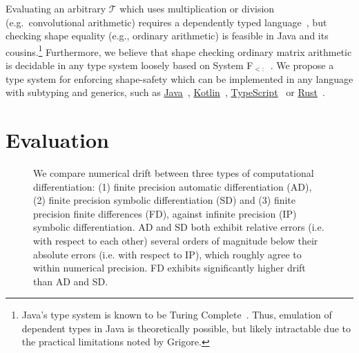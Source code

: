 \documentclass{article}
\begin{document}
Evaluating an arbitrary $\mathcal{T}$ which uses multiplication or division (e.g.\ convolutional arithmetic) requires a dependently typed language~\citep{xi1998eliminating, pineyro2019structure}, but checking shape equality (e.g., ordinary arithmetic) is feasible in Java and its cousins.\footnote{Java's type system is known to be Turing Complete~\citep{grigore2017java}. Thus, emulation of dependent types in Java is theoretically possible, but likely intractable due to the practical limitations noted by Grigore.} Furthermore, we believe that shape checking ordinary matrix arithmetic is decidable in any type system loosely based on System F${}_{<:}$~\citep{cardelli1991extension}. We propose a type system for enforcing shape-safety which can be implemented in any language with subtyping and generics, such as \href{https://docs.oracle.com/javase/tutorial/java/generics/index.html}{Java}~\citep{naftalin2007java}, \href{https://kotlinlang.org/docs/reference/generics.html}{Kotlin}~\citep{tate2013mixed}, \href{https://www.typescriptlang.org/docs/handbook/advanced-types.html}{TypeScript}~\citep{bierman2014understanding} or \href{https://doc.rust-lang.org/1.7.0/book/generics.html}{Rust}~\citep{crozet2019nalgebra}.

\section{Evaluation}
\begin{figure}
    \caption{We compare numerical drift between three types of computational differentiation: (1) finite precision automatic differentiation (AD), (2) finite precision symbolic differentiation (SD) and (3) finite precision finite differences (FD), against infinite precision (IP) symbolic differentiation. AD and SD both exhibit relative errors (i.e. with respect to each other) several orders of magnitude below their absolute errors (i.e. with respect to IP), which roughly agree to within numerical precision. FD exhibits significantly higher drift than AD and SD.}
    \label{fig:pbt_comparison}
\end{figure}
\end{document}
